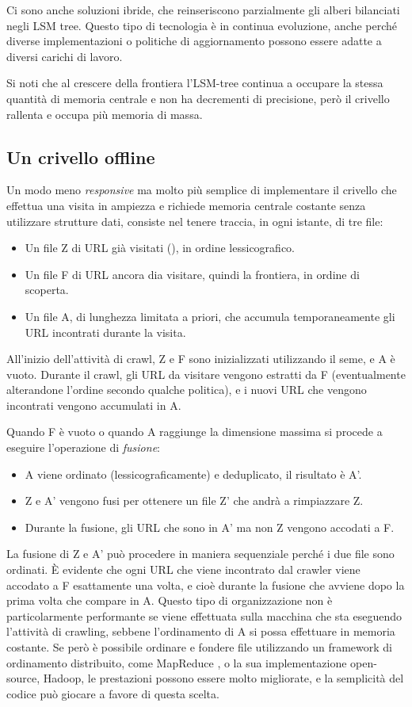 Ci sono anche soluzioni ibride, che reinseriscono parzialmente gli alberi bilanciati negli LSM tree. Questo tipo di tecnologia è in continua evoluzione, anche perché diverse implementazioni o politiche di aggiornamento possono essere adatte a diversi carichi di lavoro.

Si noti che al crescere della frontiera l'LSM-tree continua a occupare la stessa quantità di memoria centrale e non ha decrementi di precisione, però il crivello rallenta e occupa più memoria di massa.
\subsection{Un crivello offline}
Un modo meno \textit{responsive} ma molto più semplice di implementare il crivello che effettua una visita in ampiezza e richiede memoria centrale costante senza utilizzare strutture dati, consiste nel tenere traccia, in ogni istante, di tre file:
\begin{itemize}
    \item Un file Z di URL già visitati (), in ordine lessicografico.
    \item Un file F di URL ancora dia visitare, quindi la frontiera, in ordine di scoperta.
    \item Un file A, di lunghezza limitata a priori, che accumula temporaneamente gli URL incontrati durante la visita.
\end{itemize}
All'inizio dell'attività di crawl, Z e F sono inizializzati utilizzando il seme, e A è vuoto. Durante il crawl, gli URL da visitare vengono estratti da F (eventualmente alterandone l'ordine secondo qualche politica), e i nuovi URL che vengono incontrati vengono accumulati in A.

Quando F è vuoto o quando A raggiunge la dimensione massima si procede a eseguire l'operazione di \textit{fusione}:
\begin{itemize}
    \item A viene ordinato (lessicograficamente) e deduplicato, il risultato è A'.
    \item Z e A' vengono fusi per ottenere un file Z' che andrà a rimpiazzare Z.
    \item Durante la fusione, gli URL che sono in A' ma non Z vengono accodati a F.
\end{itemize}
La fusione di Z e A' può procedere in maniera sequenziale perché i due file sono ordinati. È evidente che ogni URL che viene incontrato dal crawler viene accodato a F esattamente una volta, e cioè durante la fusione che avviene dopo la prima volta che compare in A.
Questo tipo di organizzazione non è particolarmente performante se viene effettuata sulla macchina che sta eseguendo l'attività di crawling, sebbene l'ordinamento di A si possa effettuare in memoria costante. Se però è possibile ordinare e fondere file utilizzando un framework di ordinamento distribuito, come MapReduce \cite{MapReduce}, o la sua implementazione open-source, Hadoop, le prestazioni possono essere molto migliorate, e la semplicità del codice può giocare a favore di questa scelta.

